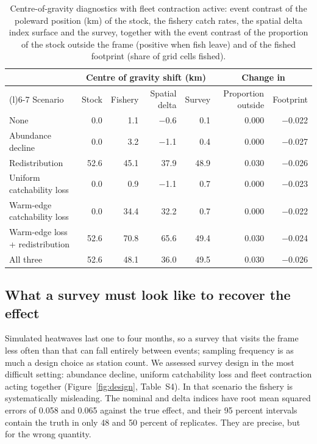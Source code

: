 \documentclass[11pt,a4paper]{article}
\begin{document}
\begin{table}[tbp]
\centering\footnotesize
\caption{Centre-of-gravity diagnostics with fleet contraction active: event contrast of the poleward position (km) of the stock, the fishery catch rates, the spatial delta index surface and the survey, together with the event contrast of the proportion of the stock outside the frame (positive when fish leave) and of the fished footprint (share of grid cells fished).}
\label{tab:cog}
\begin{tabular}{@{}>{\raggedright\arraybackslash}p{3.6cm}rrrrrr@{}}
\toprule
 & \multicolumn{4}{c}{Centre of gravity shift (km)} & \multicolumn{2}{c}{Change in} \\
\cmidrule(lr){2-5}\cmidrule(l){6-7}
Scenario & Stock & Fishery & Spatial delta & Survey & Proportion outside & Footprint \\
\midrule
None & 0.0 & 1.1 & $-$0.6 & 0.1 & 0.000 & $-$0.022 \\
Abundance decline & 0.0 & 3.2 & $-$1.1 & 0.4 & 0.000 & $-$0.027 \\
Redistribution & 52.6 & 45.1 & 37.9 & 48.9 & 0.030 & $-$0.026 \\
Uniform catchability loss & 0.0 & 0.9 & $-$1.1 & 0.7 & 0.000 & $-$0.023 \\
Warm-edge catchability loss & 0.0 & 34.4 & 32.2 & 0.7 & 0.000 & $-$0.022 \\
Warm-edge loss + redistribution & 52.6 & 70.8 & 65.6 & 49.4 & 0.030 & $-$0.024 \\
All three & 52.6 & 48.1 & 36.0 & 49.5 & 0.030 & $-$0.026 \\
\bottomrule
\end{tabular}
\end{table}

\subsection{What a survey must look like to recover the effect}
\label{sec:res-survey}

Simulated heatwaves last one to four months, so a survey that visits the frame less often than that can fall entirely between events; sampling frequency is as much a design choice as station count. We assessed survey design in the most difficult setting: abundance decline, uniform catchability loss and fleet contraction acting together (Figure~\ref{fig:design}, Table~S4). In that scenario the fishery is systematically misleading. The nominal and delta indices have root mean squared errors of 0.058 and 0.065 against the true effect, and their 95 percent intervals contain the truth in only 48 and 50 percent of replicates. They are precise, but for the wrong quantity.
\end{document}
